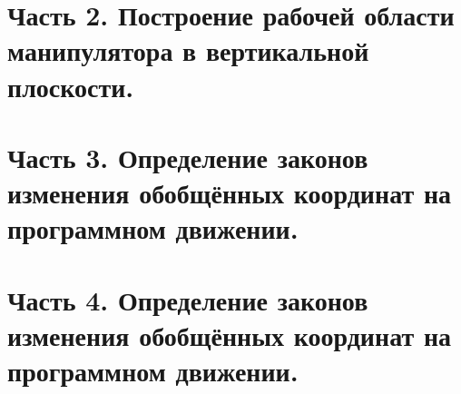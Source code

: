 \documentclass[a4paper]{article}
\begin{document}
	\section{Часть 2. Построение рабочей области манипулятора в вертикальной плоскости.}
	
	\newpage
	\section{Часть 3. Определение законов изменения обобщённых координат на программном
		движении.}
	
	\newpage
	\section{Часть 4. Определение законов изменения обобщённых координат на программном
		движении.}
\end{document}
